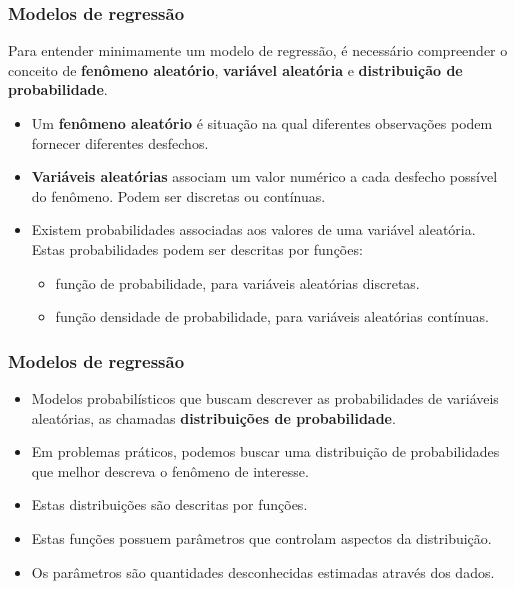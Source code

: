 \documentclass[handout,serif, professionalfont, usenames, dvipsnames, aspectratio = 169]{beamer}\usepackage[]{graphicx}\usepackage[]{color}
\begin{document}
\begin{frame}
  \frametitle{Modelos de regressão}

  Para entender minimamente um modelo de regressão, é necessário compreender o
  conceito de \textbf{fenômeno aleatório}, \textbf{variável aleatória} e \textbf{distribuição de probabilidade}.

  \begin{itemize}
    \itemsep 2ex

  \item Um \textbf{fenômeno aleatório} é situação na qual diferentes observações podem fornecer diferentes desfechos. 
  
  \item \textbf{Variáveis aleatórias} associam um valor numérico a cada desfecho possível do fenômeno. Podem ser discretas ou contínuas.
  
  \item Existem probabilidades associadas aos valores de uma variável aleatória. Estas probabilidades podem ser descritas por funções:
  
  \begin{itemize}
    \item função de probabilidade, para variáveis aleatórias discretas.
    \item função densidade de probabilidade, para variáveis aleatórias contínuas.
  \end{itemize}

  \end{itemize}
\end{frame}


\begin{frame}
  
  \frametitle{Modelos de regressão}

  \begin{itemize}
    \itemsep 2ex

  \item Modelos probabilísticos que buscam descrever as probabilidades de variáveis aleatórias, as chamadas \textbf{distribuições de probabilidade}.
  
  \item Em problemas práticos, podemos buscar uma distribuição de probabilidades que melhor descreva o fenômeno de interesse. 
  
  \item Estas distribuições são descritas por funções. 
  
  \item Estas funções possuem parâmetros que controlam aspectos da distribuição.
  
  \item Os parâmetros são quantidades desconhecidas estimadas através dos dados.
  
  \end{itemize}

\end{frame}
\end{document}
